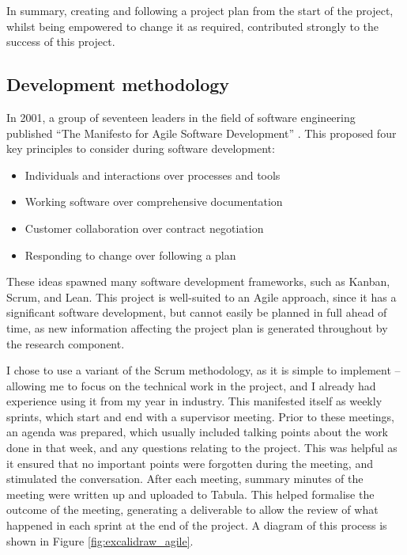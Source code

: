 
In summary, creating and following a project plan from the start of the project, whilst being empowered to change it as required, contributed strongly to the success of this project.

\subsection{Development methodology}
\label{ssec:organisation-methodology}

In 2001, a group of seventeen leaders in the field of software engineering published ``The Manifesto for Agile Software Development'' \cite{beckManifestoAgileSoftware2001}. This proposed four key principles to consider during software development:

\begin{itemize}
    \item Individuals and interactions over processes and tools
    \item Working software over comprehensive documentation
    \item Customer collaboration over contract negotiation
    \item Responding to change over following a plan
\end{itemize}

These ideas spawned many software development frameworks, such as Kanban, Scrum, and Lean. This project is well-suited to an Agile approach, since it has a significant software development, but cannot easily be planned in full ahead of time, as new information affecting the project plan is generated throughout by the research component.

I chose to use a variant of the Scrum methodology, as it is simple to implement -- allowing me to focus on the technical work in the project, and I already had experience using it from my year in industry. This manifested itself as weekly sprints, which start and end with a supervisor meeting. Prior to these meetings, an agenda was prepared, which usually included talking points about the work done in that week, and any questions relating to the project. This was helpful as it ensured that no important points were forgotten during the meeting, and stimulated the conversation. After each meeting, summary minutes of the meeting were written up and uploaded to Tabula. This helped formalise the outcome of the meeting, generating a deliverable to allow the review of what happened in each sprint at the end of the project. A diagram of this process is shown in Figure \ref{fig:excalidraw_agile}.

